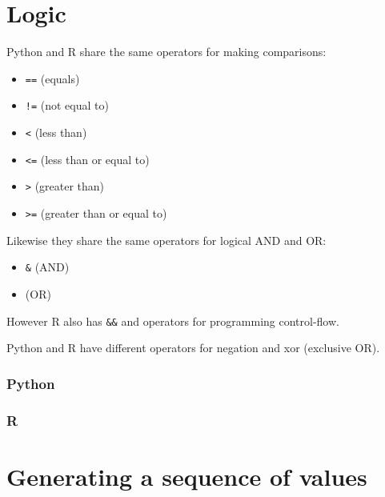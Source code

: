 \documentclass[
]{book}
\providecommand{\tightlist}{%
  \setlength{\itemsep}{0pt}\setlength{\parskip}{0pt}}
\begin{document}
\hypertarget{logic}{%
\section{Logic}\label{logic}}

Python and R share the same operators for making comparisons:

\begin{itemize}
\tightlist
\item
  \texttt{==} (equals)
\item
  \texttt{!=} (not equal to)
\item
  \texttt{\textless{}} (less than)
\item
  \texttt{\textless{}=} (less than or equal to)
\item
  \texttt{\textgreater{}} (greater than)
\item
  \texttt{\textgreater{}=} (greater than or equal to)
\end{itemize}

Likewise they share the same operators for logical AND and OR:

\begin{itemize}
\tightlist
\item
  \texttt{\&} (AND)
\item
  \texttt{\textbar{}} (OR)
\end{itemize}

However R also has \texttt{\&\&} and \texttt{\textbar{}\textbar{}} operators for programming control-flow.

Python and R have different operators for negation and xor (exclusive OR).

\hypertarget{python-4}{%
\subsubsection*{Python}\label{python-4}}

\hypertarget{r-4}{%
\subsubsection*{R}\label{r-4}}

\hypertarget{generating-a-sequence-of-values}{%
\section{Generating a sequence of values}\label{generating-a-sequence-of-values}}
\end{document}
